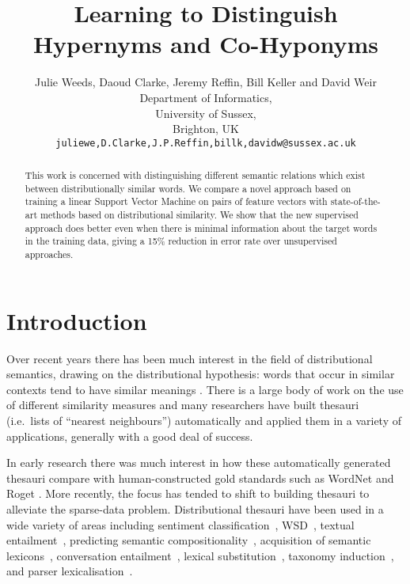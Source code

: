 \documentclass[11pt]{article}
\title{Learning to Distinguish Hypernyms and Co-Hyponyms}
\author{Julie Weeds, Daoud Clarke, Jeremy Reffin, Bill Keller and David Weir\\ Department of Informatics,\\ University of Sussex,\\ Brighton, UK\\ {\tt juliewe,D.Clarke,J.P.Reffin,billk,davidw@sussex.ac.uk}}
\date{} %
\begin{document}
\maketitle

\begin{abstract}
This work is concerned with distinguishing different semantic relations which exist between distributionally similar words.  We compare a novel approach based on training a linear Support Vector Machine on pairs of feature vectors with state-of-the-art methods based on distributional similarity. We show that the new supervised approach does better even when there is minimal information about the target words in the training data, giving a 15\% reduction in error rate over unsupervised approaches.

\end{abstract}
\section{Introduction}

Over recent years there has been much interest in the field of distributional semantics, drawing on the distributional hypothesis: words that occur in similar contexts tend to have similar meanings \cite{Harris1954}.   There is a large body of work on the use of different similarity measures \cite{Lee1999,Weeds2003,Curran2004} and many researchers have built thesauri (i.e.~lists of ``nearest neighbours'') automatically and applied them in a variety of applications, generally with a good deal of success.

In early research there was much interest in how these automatically generated thesauri compare with human-constructed gold standards such as WordNet and Roget \cite{Lin1998,Kilgarriff2000}.  More recently, the focus has tended to shift to building thesauri to alleviate the sparse-data problem.  Distributional thesauri have been used in a wide variety of areas including sentiment classification~\cite{Bollegala2011}, WSD~\cite{miller-EtAl:2012:PAPERS,khapra-EtAl:2010:ACL}, textual entailment~\cite{berant-dagan-goldberger:2010:ACL}, predicting semantic compositionality~\cite{bergsma-EtAl:2010:EMNLP}, acquisition of semantic lexicons~\cite{mcintosh:2010:EMNLP}, conversation entailment~\cite{zhang-chai:2010:EMNLP}, lexical substitution~\cite{szarvas-biemann-gurevych:2013:NAACL-HLT}, taxonomy induction~\cite{fountain-lapata:2012:NAACL-HLT}, and parser lexicalisation~\cite{rei-briscoe:2013:NAACL-HLT}.  
\end{document}
